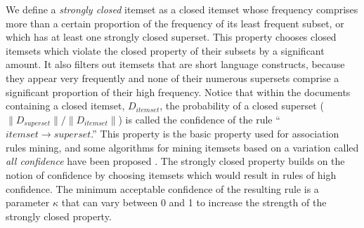 \documentclass{sig-alternate}
\begin{document}
We define a \emph{strongly closed} itemset as a closed itemset whose frequency comprises more than a certain proportion of the frequency of its least frequent subset, or which has at least one strongly closed superset. This property chooses closed itemsets which violate the closed property of their subsets by a significant amount. It also filters out itemsets that are short language constructs, because they appear very frequently and none of their numerous supersets comprise a significant proportion of their high frequency. Notice that within the documents containing a closed itemset, $D_{itemset}$, the probability of a closed superset ($\|D_{superset}\| / \|D_{itemset}\|$) is called the confidence of the rule ``$itemset \rightarrow superset$.'' This property is the basic property used for association rules mining, and some algorithms for mining itemsets based on a variation called \emph{all confidence} have been proposed \cite{confidenceclosed}. The strongly closed property builds on the notion of confidence by choosing itemsets which would result in rules of high confidence. The minimum acceptable confidence of the resulting rule is a parameter $\kappa$ that can vary between 0 and 1 to increase the strength of the strongly closed property.
\end{document}
